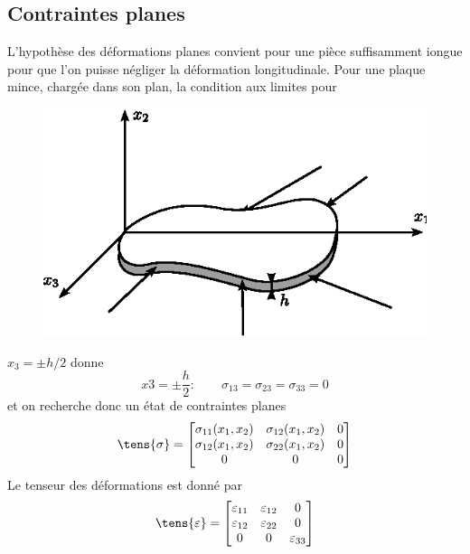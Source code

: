 \subsection{Contraintes planes}
L'hypothèse des déformations planes convient pour une pièce suffisamment iongue pour que l'on puisse négliger la déformation longitudinale. 
Pour une plaque mince, chargée dans son plan, la condition aux limites pour 
\begin{figure}
    \begin{center}
\includegraphics{../images/T1_Ch08-01}
    \end{center}
\end{figure}
$x_3=\pm h/2$ donne 
\begin{equation}
  x3 = \pm \dfrac{h}{2} : \qquad \sigma_{13}=\sigma_{23}=\sigma_{33}=0
\label{eq:Ch08-014}
\end{equation}
et on recherche donc un état de contraintes planes 
\begin{equation}
  \tens{\sigma}=\begin{bmatrix}
     \sigma_{11}(x_1,x_2) & \sigma_{12}(x_1,x_2) & 0 \\
     \sigma_{12}(x_1,x_2) & \sigma_{22}(x_1,x_2) & 0 \\
      0                   &  0                   & 0 
   \end{bmatrix}
\label{eq:Ch08-015}
\end{equation}
Le tenseur des déformations est donné par
\begin{equation}
  \tens{\varepsilon} = \begin{bmatrix}
     \varepsilon_{11} & \varepsilon_{12} & 0           \\
     \varepsilon_{12} & \varepsilon_{22} & 0           \\
      0               &  0               & \varepsilon_{33} 
   \end{bmatrix}
\label{eq:Ch08-016}
\end{equation}
